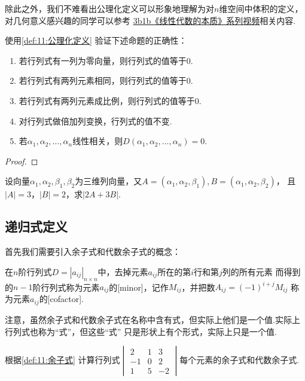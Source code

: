 除此之外，我们不难看出公理化定义可以形象地理解为对$n$维空间中体积的定义，
对几何意义感兴趣的同学可以参考 \href{https://b23.tv/BV1ys411472E}{3b1b《线性代数的本质》系列视频}相关内容.
\begin{example} \label{ex:11:公理化定义}
    使用\autoref{def:11:公理化定义} 验证下述命题的正确性：
    \begin{enumerate}
        \item 若行列式有一列为零向量，则行列式的值等于0.

        \item 若行列式有两列元素相同，则行列式的值等于0.

        \item 若行列式有两列元素成比例，则行列式的值等于0.

        \item 对行列式做倍加列变换，行列式的值不变.

        \item 若$\alpha_1,\alpha_2,\ldots,\alpha_n$线性相关，则$D(\alpha_1,\alpha_2,\ldots,\alpha_n)=0$.
    \end{enumerate}
\end{example}
\begin{proof}
    
\end{proof}

\begin{example} \label{ex:11:公理化定义2}
    设向量$\alpha_1,\alpha_2,\beta_1,\beta_2$为三维列向量，又$A=(\alpha_1,\alpha_2,\beta_1),B=(\alpha_1,\alpha_2,\beta_2)$，
    且$|A|=3$，$|B|=2$，求$|2A+3B|$.
\end{example}
\begin{solution}

\end{solution}

\subsection{递归式定义}
首先我们需要引入余子式和代数余子式的概念：
\begin{definition} \label{def:11:余子式}
    在$n$阶行列式$D=|a_{ij}|_{n \times n}$中，去掉元素$a_{ij}$所在的第$i$行和第$j$列的所有元素
    而得到的$n-1$阶行列式称为元素$a_{ij}$的[minor]，记作$M_{ij}$，并把数$A_{ij}=(-1)^{i+j}M_{ij}$
    称为元素$a_{ij}$的[cofactor].
\end{definition}
注意，虽然余子式和代数余子式在名称中含有式，但实际上他们是一个值.实际上行列式也称为``式''，但这些``式''
只是形状上有个形式，实际上只是一个值.
\begin{example} \label{ex:11:cofactor}
    根据\autoref{def:11:余子式} 计算行列式$\begin{vmatrix}
        2 & 1 & 3 \\
        -1 & 0 & 2 \\
        1 & 5 & -2
    \end{vmatrix}$每个元素的余子式和代数余子式.
\end{example}
\begin{solution}

\end{solution}

